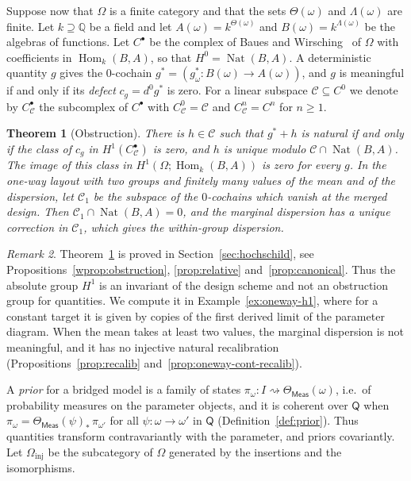 \documentclass[11pt,a4paper]{article}
\theoremstyle{plain}
\newtheorem{theorem}{Theorem}[section]
\theoremstyle{definition}
\theoremstyle{remark}
\newtheorem{remark}[theorem]{Remark}
\newcommand{\cat}[1]{\mathsf{#1}}
\newcommand{\catO}{\cat{\Omega}}
\newcommand{\Meas}{\cat{Meas}}
\DeclareMathOperator{\Nat}{Nat}
\DeclareMathOperator{\Hom}{Hom}
\begin{document}
Suppose now that $\catO$ is a finite category and that the sets
$\Theta(\omega)$ and $\Lambda(\omega)$ are finite. Let $k \supseteq \mathbb{Q}$
be a field and let $A(\omega) = k^{\Theta(\omega)}$ and
$B(\omega) = k^{\Lambda(\omega)}$ be the algebras of functions. Let
$C^{\bullet}$ be the complex of Baues and
Wirsching~\cite{baues_cohomology_1985} of $\catO$ with coefficients in
$\Hom_k(B,A)$, so that $H^{0} = \Nat(B,A)$. A deterministic quantity $g$ gives
the $0$-cochain $g^{*} = (g_{\omega}^{*} \colon B(\omega) \to A(\omega))$, and
$g$ is meaningful if and only if its \emph{defect} $c_g = d^{0}g^{*}$ is zero.
For a linear subspace $\mathcal{C} \subseteq C^{0}$ we denote by
$C^{\bullet}_{\mathcal{C}}$ the subcomplex of $C^{\bullet}$ with
$C^{0}_{\mathcal{C}} = \mathcal{C}$ and $C^{n}_{\mathcal{C}} = C^{n}$ for
$n \ge 1$.

\begin{theorem}[Obstruction]\label{thm:main-obstruction}
There is $h \in \mathcal{C}$ such that $g^{*} + h$ is natural if and only if
the class of $c_g$ in $H^{1}(C^{\bullet}_{\mathcal{C}})$ is zero, and $h$ is
unique modulo $\mathcal{C} \cap \Nat(B,A)$. The image of this class in
$H^{1}(\catO;\Hom_k(B,A))$ is zero for every $g$. In the one-way layout with
two groups and finitely many values of the mean and of the dispersion, let
$\mathcal{C}_{1}$ be the subspace of the $0$-cochains which vanish at the
merged design. Then $\mathcal{C}_{1} \cap \Nat(B,A) = 0$, and the marginal
dispersion has a unique correction in $\mathcal{C}_{1}$, which gives the
within-group dispersion.
\end{theorem}

\begin{remark}\label{rem:main-obstruction}
Theorem~\ref{thm:main-obstruction} is proved in Section~\ref{sec:hochschild},
see Propositions~\ref{wprop:obstruction}, \ref{prop:relative}
and~\ref{prop:canonical}. Thus the absolute group $H^{1}$ is an invariant of
the design scheme and not an obstruction group for quantities. We compute it
in Example~\ref{ex:oneway-h1}, where for a constant target it is given by
copies of the first derived limit of the parameter diagram. When the mean takes
at least two values, the marginal dispersion is not meaningful, and it has no
injective natural recalibration (Propositions~\ref{prop:recalib}
and~\ref{prop:oneway-cont-recalib}).
\end{remark}

A \emph{prior} for a bridged model is a family of states
$\pi_{\omega} \colon I \rightsquigarrow \Theta_\Meas(\omega)$, i.e.\ of
probability measures on the parameter objects, and it is coherent over
$\cat{Q}$ when $\pi_{\omega} = \Theta_\Meas(\psi)_{*}\,\pi_{\omega'}$ for all
$\psi \colon \omega \to \omega'$ in $\cat{Q}$ (Definition~\ref{def:prior}).
Thus quantities transform contravariantly with the parameter, and priors
covariantly. Let $\catO_{\mathrm{inj}}$ be the subcategory of $\catO$
generated by the insertions and the isomorphisms.
\end{document}
